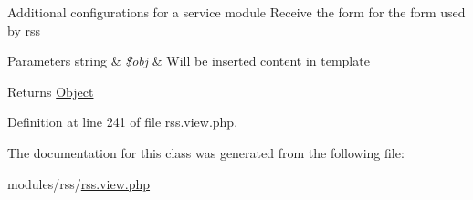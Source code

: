 Additional configurations for a service module Receive the form for the form used by rss


\begin{DoxyParams}[1]{Parameters}
string & {\em \$obj} & Will be inserted content in template \\
\hline
\end{DoxyParams}
\begin{DoxyReturn}{Returns}
\hyperlink{classObject}{Object} 
\end{DoxyReturn}


Definition at line 241 of file rss.\+view.\+php.



The documentation for this class was generated from the following file\+:\begin{DoxyCompactItemize}
\item 
modules/rss/\hyperlink{rss_8view_8php}{rss.\+view.\+php}\end{DoxyCompactItemize}
